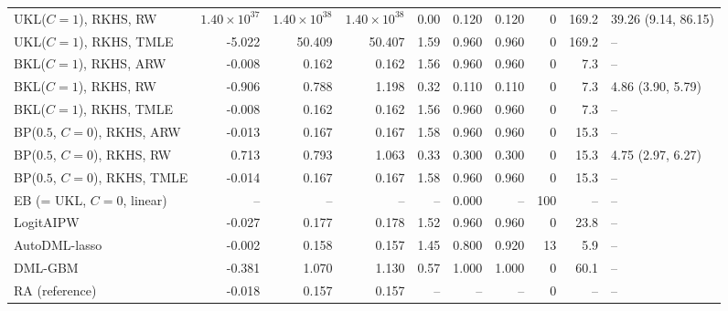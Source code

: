 \begin{tabular}{lrrrrrrrrl}
UKL($C=1$), RKHS, RW & $1.40\times10^{37}$ & $1.40\times10^{38}$ & $1.40\times10^{38}$ & 0.00 & 0.120 & 0.120 & 0 & 169.2 & 39.26 (9.14, 86.15) \\
UKL($C=1$), RKHS, TMLE & -5.022 & 50.409 & 50.407 & 1.59 & 0.960 & 0.960 & 0 & 169.2 & -- \\
BKL($C=1$), RKHS, ARW & -0.008 & 0.162 & 0.162 & 1.56 & 0.960 & 0.960 & 0 & 7.3 & -- \\
BKL($C=1$), RKHS, RW & -0.906 & 0.788 & 1.198 & 0.32 & 0.110 & 0.110 & 0 & 7.3 & 4.86 (3.90, 5.79) \\
BKL($C=1$), RKHS, TMLE & -0.008 & 0.162 & 0.162 & 1.56 & 0.960 & 0.960 & 0 & 7.3 & -- \\
BP($0.5$, $C=0$), RKHS, ARW & -0.013 & 0.167 & 0.167 & 1.58 & 0.960 & 0.960 & 0 & 15.3 & -- \\
BP($0.5$, $C=0$), RKHS, RW & 0.713 & 0.793 & 1.063 & 0.33 & 0.300 & 0.300 & 0 & 15.3 & 4.75 (2.97, 6.27) \\
BP($0.5$, $C=0$), RKHS, TMLE & -0.014 & 0.167 & 0.167 & 1.58 & 0.960 & 0.960 & 0 & 15.3 & -- \\
EB (= UKL, $C=0$, linear) & -- & -- & -- & -- & 0.000 & -- & 100 & -- & -- \\
LogitAIPW & -0.027 & 0.177 & 0.178 & 1.52 & 0.960 & 0.960 & 0 & 23.8 & -- \\
AutoDML-lasso & -0.002 & 0.158 & 0.157 & 1.45 & 0.800 & 0.920 & 13 & 5.9 & -- \\
DML-GBM & -0.381 & 1.070 & 1.130 & 0.57 & 1.000 & 1.000 & 0 & 60.1 & -- \\
RA (reference) & -0.018 & 0.157 & 0.157 & -- & -- & -- & 0 & -- & -- \\
\hline
\end{tabular}
